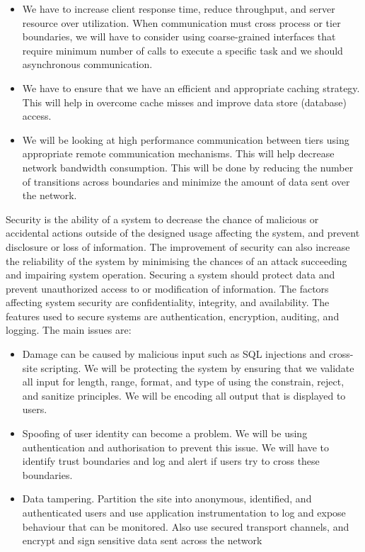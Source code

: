 \documentclass[11pt]{article}
\begin{document}
			\begin{itemize}
				\item We have to increase client response time, reduce throughput, and server resource over utilization. When communication must cross process or tier boundaries, we will have to consider using coarse-grained interfaces that require minimum number of calls to execute a specific task and we should asynchronous communication.
				
				\item We have to ensure that we have an efficient and appropriate caching strategy. This will help in overcome cache misses and improve data store (database) access.
				
				\item We will be looking at high performance communication between tiers using appropriate remote communication mechanisms. This will help decrease network bandwidth consumption. This will be done by reducing the number of transitions across boundaries and minimize the amount of data sent over the network. 
			
			\end{itemize}
			Security is the ability of a system to decrease the chance of malicious or accidental actions outside of the designed usage affecting the system, and prevent disclosure or loss of information. The improvement of security can also increase the reliability of the system by minimising the chances of an attack succeeding and impairing system operation. Securing a system should protect data and prevent unauthorized access to or modification of information. The factors affecting system security are confidentiality, integrity, and availability. The features used to secure systems are authentication, encryption, auditing, and logging. The main issues are:
			\begin{itemize}
				\item Damage can be caused by malicious input such as SQL injections and cross-site scripting. We will be protecting the system by ensuring that we validate all input for length, range, format, and type of using the constrain, reject, and sanitize principles. We will be encoding all output that is displayed to users.
				
				\item  Spoofing of user identity can become a problem. We will be using authentication and authorisation to prevent this issue. We will have to identify trust boundaries and log and alert if users try to cross these boundaries.
				
				\item Data tampering. Partition the site into anonymous, identified, and authenticated users and use application instrumentation to log and expose behaviour that can be monitored. Also use secured transport channels, and encrypt and sign sensitive data sent across the network
			\end{itemize}
				
\end{document}
